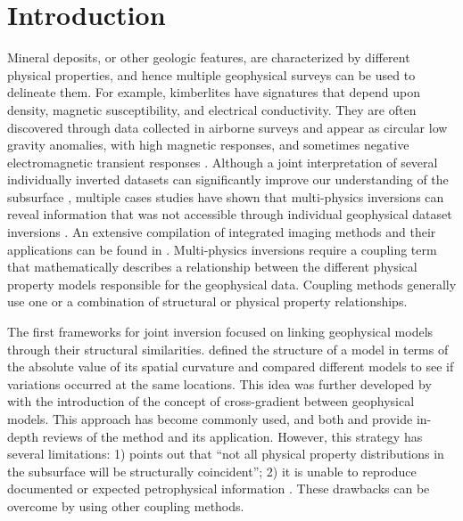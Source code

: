 \documentclass[extra, mreferee]{gji_joint} %
\begin{document}
\section{Introduction}

Mineral deposits, or other geologic features, are characterized by different physical properties, and hence multiple geophysical surveys can be used to delineate them. For example, kimberlites have signatures that depend upon density, magnetic susceptibility, and electrical conductivity. They are often discovered through data collected in airborne surveys and appear as circular low gravity anomalies, with high magnetic responses, and sometimes negative electromagnetic transient responses \citep{Macnae, Keating, Bournas}. Although a joint interpretation of several individually inverted datasets can significantly improve our understanding of the subsurface \citep{OldenburgMilligan1997, TKCpaper, TKCIP, PostInversionClustering0,  PostInversionClustering1, PostInversionClustering3, PostInversionClustering2,  Melo2017}, multiple cases studies have shown that multi-physics inversions can reveal information that was not accessible through individual geophysical dataset inversions \citep{Doetsch2010, Jegen2009, Kamm2015, Lelievre2016}. An extensive compilation of integrated imaging methods and their applications can be found in \citet{integratedImaging}. Multi-physics inversions require a coupling term that mathematically describes a relationship between the different physical property models responsible for the geophysical data. Coupling methods generally use one or a combination of structural or physical property relationships.

The first frameworks for joint inversion focused on linking geophysical models through their structural similarities. \citet{Haber1997} defined the structure of a model in terms of the absolute value of its spatial curvature and compared different models to see if variations occurred at the same locations. This idea was further developed by \citet{Gallardo2003} with the introduction of the concept of cross-gradient between geophysical models. This approach has become commonly used, and both \citet{Gallardo2011} and \citet{Meju2016} provide in-depth reviews of the method and its application. However, this strategy has several limitations: 1) \citet{Meju2016} points out that ``not all physical property distributions in the subsurface will be structurally coincident''; 2) it is unable to reproduce documented or expected petrophysical information \citep{Sun2017}. These drawbacks can be overcome by using other coupling methods.
\end{document}
